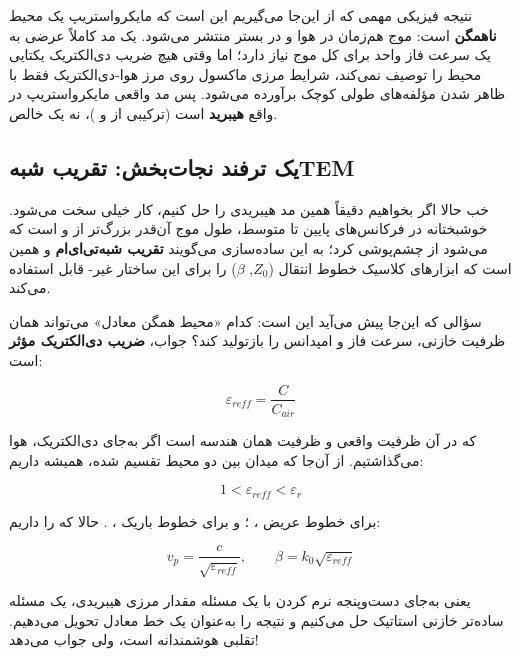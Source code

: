 \documentclass[12pt]{article}
\begin{document}
	نتیجه فیزیکی مهمی که از این‌جا می‌گیریم این است که مایکرواستریپ یک محیط \textbf{ناهمگن} است: موج هم‌زمان در هوا و در بستر منتشر می‌شود. یک مد کاملاً عرضی  به یک سرعت فاز واحد  برای کل موج نیاز دارد؛ اما وقتی هیچ ضریب دی‌الکتریک یکتایی محیط را توصیف نمی‌کند، شرایط مرزی ماکسول روی مرز هوا-دی‌الکتریک فقط با ظاهر شدن مؤلفه‌های طولی کوچک  برآورده می‌شود. پس مد واقعی مایکرواستریپ در واقع \textbf{هیبرید} است (ترکیبی از  و )، نه یک  خالص.
	
	\subsection{یک ترفند نجات‌بخش: تقریب شبه‌TEM}
	
	خب حالا اگر بخواهیم دقیقاً همین مد هیبریدی را حل کنیم، کار خیلی سخت می‌شود. خوشبختانه در فرکانس‌های پایین تا متوسط، طول موج آن‌قدر بزرگ‌تر از  و  است که می‌شود از  چشم‌پوشی کرد؛ به این ساده‌سازی می‌گویند \textbf{تقریب شبه‌تی‌ای‌ام} و همین است که ابزارهای کلاسیک خطوط انتقال ($Z_0$, $\beta$) را برای این ساختار غیر- قابل استفاده می‌کند.
	
	سؤالی که این‌جا پیش می‌آید این است: کدام «محیط همگن معادل» می‌تواند همان ظرفیت خازنی، سرعت فاز و امپدانس را بازتولید کند؟ جواب، \textbf{ضریب دی‌الکتریک مؤثر} است:
	
	\begin{equation}
		\varepsilon_{reff} = \frac{C}{C_{air}}
	\end{equation}
	
	که در آن  ظرفیت واقعی و  ظرفیت همان هندسه است اگر به‌جای دی‌الکتریک، هوا می‌گذاشتیم. از آن‌جا که میدان بین دو محیط تقسیم شده، همیشه داریم:
	
	\begin{equation}
		1 < \varepsilon_{reff} < \varepsilon_r
	\end{equation}
	
	برای خطوط عریض ، ؛ و برای خطوط باریک ، . حالا که  را داریم:
	
	\begin{equation}
		v_p = \frac{c}{\sqrt{\varepsilon_{reff}}}, \qquad \beta = k_0\sqrt{\varepsilon_{reff}}
	\end{equation}
	
	یعنی به‌جای دست‌وپنجه نرم کردن با یک مسئله مقدار مرزی هیبریدی، یک مسئله ساده‌تر خازنی استاتیک حل می‌کنیم و نتیجه را به‌عنوان یک خط  معادل تحویل می‌دهیم. تقلبی هوشمندانه است، ولی جواب می‌دهد!
	
\end{document}
